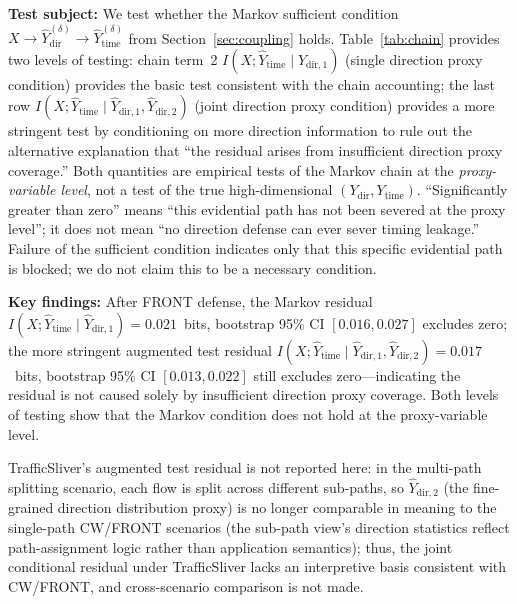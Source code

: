 \documentclass[lettersize,journal]{IEEEtran}
\begin{document}
\textbf{Test subject:} We test whether the Markov sufficient condition
$X\to \hat{Y}^{(\delta)}_{\mathrm{dir}}\to \hat{Y}^{(\delta)}_{\mathrm{time}}$
from Section~\ref{sec:coupling} holds.
Table~\ref{tab:chain} provides two levels of testing:
chain term~2 $I(X;\hat{Y}_{\mathrm{time}}\mid \hat{Y}_{\mathrm{dir},1})$
(single direction proxy condition) provides the basic test consistent with
the chain accounting;
the last row $I(X;\hat{Y}_{\mathrm{time}}\mid \hat{Y}_{\mathrm{dir},1},\hat{Y}_{\mathrm{dir},2})$
(joint direction proxy condition) provides a more stringent test by
conditioning on more direction information to rule out the alternative
explanation that ``the residual arises from insufficient direction proxy
coverage.''
Both quantities are empirical tests of the Markov chain at the
\emph{proxy-variable level}, not a test of the true high-dimensional
$(Y_{\mathrm{dir}},Y_{\mathrm{time}})$.
``Significantly greater than zero'' means ``this evidential path has not
been severed at the proxy level''; it does not mean ``no direction defense
can ever sever timing leakage.''
Failure of the sufficient condition indicates only that this specific
evidential path is blocked; we do not claim this to be a necessary condition.

\textbf{Key findings:}
After FRONT defense, the Markov residual
$I(X;\hat{Y}_{\mathrm{time}}\mid \hat{Y}_{\mathrm{dir},1}) = 0.021$~bits,
bootstrap 95\% CI $[0.016, 0.027]$ excludes zero;
the more stringent augmented test residual
$I(X;\hat{Y}_{\mathrm{time}}\mid \hat{Y}_{\mathrm{dir},1},\hat{Y}_{\mathrm{dir},2}) = 0.017$~bits,
bootstrap 95\% CI $[0.013, 0.022]$ still excludes zero---indicating the
residual is not caused solely by insufficient direction proxy coverage.
Both levels of testing show that the Markov condition does not hold at the
proxy-variable level.

TrafficSliver's augmented test residual is not reported here: in the
multi-path splitting scenario, each flow is split across different
sub-paths, so $\hat{Y}_{\mathrm{dir},2}$ (the fine-grained direction
distribution proxy) is no longer comparable in meaning to the single-path
CW/FRONT scenarios (the sub-path view's direction statistics reflect
path-assignment logic rather than application semantics); thus, the joint
conditional residual under TrafficSliver lacks an interpretive basis
consistent with CW/FRONT, and cross-scenario comparison is not made.
\end{document}
